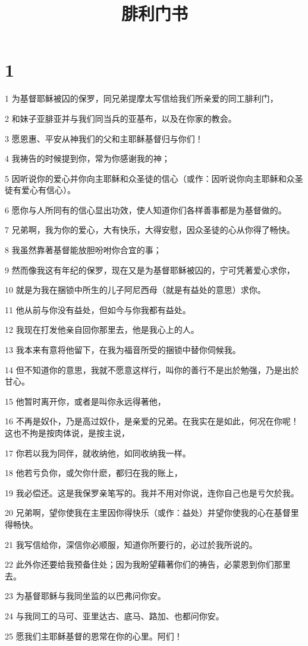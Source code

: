 

\title{腓利门书}


\chapter{1}

\par 1 为基督耶稣被囚的保罗，同兄弟提摩太写信给我们所亲爱的同工腓利门，
\par 2 和妹子亚腓亚并与我们同当兵的亚基布，以及在你家的教会。
\par 3 愿恩惠、平安从神我们的父和主耶稣基督归与你们！
\par 4 我祷告的时候提到你，常为你感谢我的神；
\par 5 因听说你的爱心并你向主耶稣和众圣徒的信心（或作：因听说你向主耶稣和众圣徒有爱心有信心）。
\par 6 愿你与人所同有的信心显出功效，使人知道你们各样善事都是为基督做的。
\par 7 兄弟啊，我为你的爱心，大有快乐，大得安慰，因众圣徒的心从你得了畅快。
\par 8 我虽然靠著基督能放胆吩咐你合宜的事；
\par 9 然而像我这有年纪的保罗，现在又是为基督耶稣被囚的，宁可凭著爱心求你，
\par 10 就是为我在捆锁中所生的儿子阿尼西母（就是有益处的意思）求你。
\par 11 他从前与你没有益处，但如今与你我都有益处。
\par 12 我现在打发他亲自回你那里去，他是我心上的人。
\par 13 我本来有意将他留下，在我为福音所受的捆锁中替你伺候我。
\par 14 但不知道你的意思，我就不愿意这样行，叫你的善行不是出於勉强，乃是出於甘心。
\par 15 他暂时离开你，或者是叫你永远得著他，
\par 16 不再是奴仆，乃是高过奴仆，是亲爱的兄弟。在我实在是如此，何况在你呢！这也不拘是按肉体说，是按主说，
\par 17 你若以我为同伴，就收纳他，如同收纳我一样。
\par 18 他若亏负你，或欠你什麽，都归在我的账上，
\par 19 我必偿还。这是我保罗亲笔写的。我并不用对你说，连你自己也是亏欠於我。
\par 20 兄弟啊，望你使我在主里因你得快乐（或作：益处）并望你使我的心在基督里得畅快。
\par 21 我写信给你，深信你必顺服，知道你所要行的，必过於我所说的。
\par 22 此外你还要给我预备住处；因为我盼望藉著你们的祷告，必蒙恩到你们那里去。
\par 23 为基督耶稣与我同坐监的以巴弗问你安。
\par 24 与我同工的马可、亚里达古、底马、路加、也都问你安。
\par 25 愿我们主耶稣基督的恩常在你的心里。阿们！


